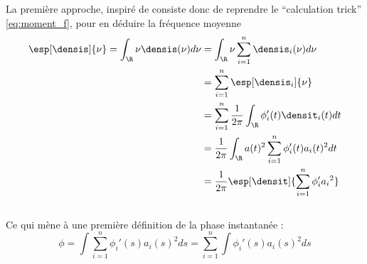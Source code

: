 La première approche, inspiré de \cite{cano_mathematical_2022} consiste donc de reprendre le ``calculation trick'' \eqref{eq:moment_f}, pour en déduire la fréquence moyenne
\begin{align*}
	\esp[\densis]{\nu} = \int_\R \nu\densis(\nu)d\nu &= \int_\R \nu\sum_{i=1}^n \densis_i(\nu) d\nu \\
		 &= \sum_{i=1}^n\esp[\densis_i]{\nu} \\
		 &= \sum_{i=1}^n\frac{1}{2\pi}\int_\R \phi_i'(t)\densit_i(t)dt \\
		 &= \frac{1}{2\pi}\int_\R a(t)^2\sum_{i=1}^n\phi_i'(t)a_i(t)^2 dt 
		 \\ &= \frac{1}{2\pi} \esp[\densit]{\sum_{i=1}^n \phi_i'{a_i}^2}
\end{align*}
\\
Ce qui mène à une première définition de la phase instantanée :
\begin{equation}\label{eq:phas_inst_v1}
	\phi = \int \sum_{i=1}^n \phi_i'(s){a_i}(s)^2ds 
	= \sum_{i=1}^n \int \phi_i'(s){a_i}(s)^2ds 
\end{equation}
\\


